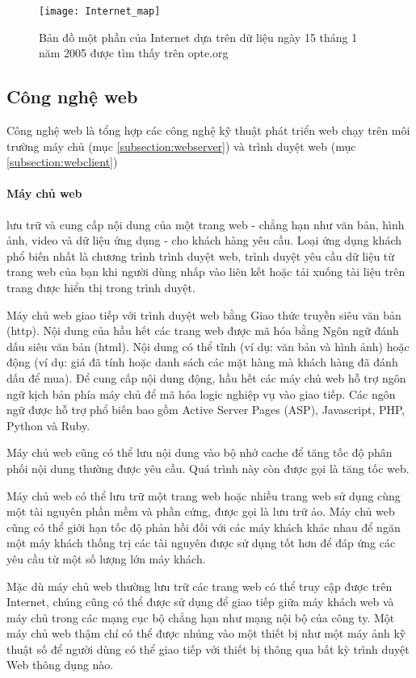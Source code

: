 \begin{figure}[h]
	\caption{Bản đồ một phần của Internet dựa trên dữ liệu ngày 15 tháng 1 năm 2005 được tìm thấy trên opte.org}
	\centering
	\texttt{[image: Internet\_map]}
	\label{fig:ill:internet}
\end{figure}

\subsection{Công nghệ web}

Công nghệ web là tổng hợp các công nghệ kỹ thuật phát triển web chạy trên môi trường máy chủ (mục \ref{subsection:webserver}) và trình duyệt web (mục \ref{subsection:webclient})

\paragraph{Máy chủ web \cite{web:server:what}} lưu trữ và cung cấp nội dung của một trang web - chẳng hạn như văn bản, hình ảnh, video và dữ liệu ứng dụng - cho khách hàng yêu cầu. Loại ứng dụng khách phổ biến nhất là chương trình trình duyệt web, trình duyệt yêu cầu dữ liệu từ trang web của bạn khi người dùng nhấp vào liên kết hoặc tải xuống tài liệu trên trang được hiển thị trong trình duyệt.

Máy chủ web giao tiếp với trình duyệt web bằng Giao thức truyền siêu văn bản (\acrshort{http}). Nội dung của hầu hết các trang web được mã hóa bằng Ngôn ngữ đánh dấu siêu văn bản (\acrshort{html}). Nội dung có thể tĩnh (ví dụ: văn bản và hình ảnh) hoặc động (ví dụ: giá đã tính hoặc danh sách các mặt hàng mà khách hàng đã đánh dấu để mua). Để cung cấp nội dung động, hầu hết các máy chủ web hỗ trợ ngôn ngữ kịch bản phía máy chủ để mã hóa logic nghiệp vụ vào giao tiếp. Các ngôn ngữ được hỗ trợ phổ biến bao gồm Active Server Pages (ASP), Javascript, PHP, Python và Ruby.

Máy chủ web cũng có thể lưu nội dung vào bộ nhớ cache để tăng tốc độ phân phối nội dung thường được yêu cầu. Quá trình này còn được gọi là tăng tốc web.

Máy chủ web có thể lưu trữ một trang web hoặc nhiều trang web sử dụng cùng một tài nguyên phần mềm và phần cứng, được gọi là lưu trữ ảo. Máy chủ web cũng có thể giới hạn tốc độ phản hồi đối với các máy khách khác nhau để ngăn một máy khách thống trị các tài nguyên được sử dụng tốt hơn để đáp ứng các yêu cầu từ một số lượng lớn máy khách.

Mặc dù máy chủ web thường lưu trữ các trang web có thể truy cập được trên Internet, chúng cũng có thể được sử dụng để giao tiếp giữa máy khách web và máy chủ trong các mạng cục bộ chẳng hạn như mạng nội bộ của công ty. Một máy chủ web thậm chí có thể được nhúng vào một thiết bị như một máy ảnh kỹ thuật số để người dùng có thể giao tiếp với thiết bị thông qua bất kỳ trình duyệt Web thông dụng nào.

